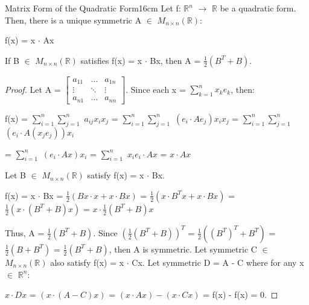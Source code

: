     \begin{wtheorem}{Matrix Form of the Quadratic Form}{16cm}
        Let f: $\mathbb{R}^n$ $\rightarrow$ $\mathbb{R}$
        be a quadratic form. Then, there is a unique symmetric
        A $\in$ $M_{n \times n}(\mathbb{R})$:

        \hspace{0.5cm}
        f(x) = x $\cdot$ Ax

        If B $\in$ $M_{n \times n}(\mathbb{R})$ satisfies
        f(x) = x $\cdot$ Bx, then A = $\frac{1}{2}(B^T + B)$.
    \end{wtheorem}

    \begin{proof}
        Let A =
        $\begin{bmatrix}
            a_{11} & \hdots & a_{1n} \\
            \vdots & \ddots & \vdots \\
            a_{n1} & \hdots & a_{nn}
        \end{bmatrix}$. Since each x = $\sum_{k=1}^n x_ke_k$, then:

        \hspace{0.5cm}
        f(x)
        = $\sum_{i=1}^n \sum_{j=1}^n$ $a_{ij}x_ix_j$
        = $\sum_{i=1}^n \sum_{j=1}^n$ $(e_i \cdot Ae_j)x_ix_j$
        = $\sum_{i=1}^n \sum_{j=1}^n$ $(e_i \cdot A(x_je_j))x_i$

        \hspace{1.3cm}
        = $\sum_{i=1}^n$ $(e_i \cdot Ax)x_i$
        = $\sum_{i=1}^n$ $x_ie_i \cdot Ax$
        = $x \cdot Ax$

        Let B $\in$ $M_{n \times n}(\mathbb{R})$ satisfy f(x) = x $\cdot$ Bx.

        \hspace{0.5cm}
        f(x)
        = x $\cdot$ Bx
        = $\frac{1}{2}(Bx \cdot x + x \cdot Bx)$
        = $\frac{1}{2}(x \cdot B^Tx + x \cdot Bx)$
        = $\frac{1}{2}(x \cdot (B^T + B)x)$
        = $x \cdot \frac{1}{2}(B^T + B)x$

        Thus, A = $\frac{1}{2}(B^T + B)$.
        Since $(\frac{1}{2}(B^T + B))^T$
        = $\frac{1}{2}((B^T)^T + B^T)$
        = $\frac{1}{2}(B + B^T)$
        = $\frac{1}{2}(B^T + B)$, then A is symmetric.
        Let symmetric C $\in$ $M_{n \times n}(\mathbb{R})$
        also satisfy f(x) = x $\cdot$ Cx.
        Let symmetric D = A - C where for any x $\in$ $\mathbb{R}^n$:

        \hspace{0.5cm}
        $x \cdot Dx$
        = $(x \cdot (A-C)x)$
        = $(x \cdot Ax) - (x \cdot Cx)$
        = f(x) - f(x)
        = 0.
        

\end{proof}
